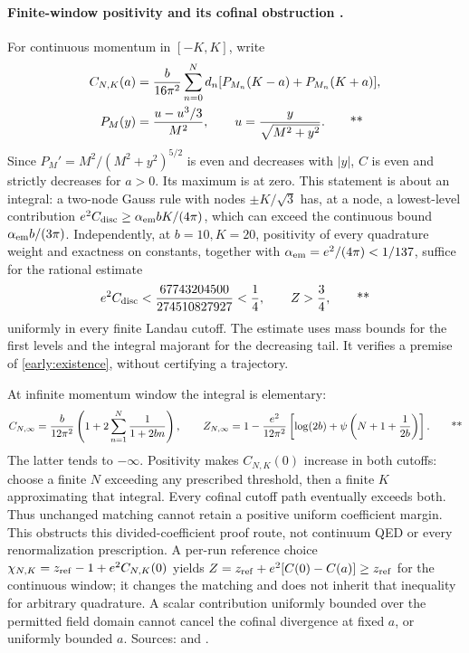 \paragraph{Finite-window positivity and its cofinal obstruction \workstar.}
For continuous momentum in \([-K,K]\), write
\begin{align}
 C_{N,K}(a)&=\frac{b}{16\pi^2}\sum_{n=0}^Nd_n
 [P_{M_n}(K-a)+P_{M_n}(K+a)],\notag\\
 P_M(y)&=\frac{u-u^3/3}{M^2},\qquad u=\frac{y}{\sqrt{M^2+y^2}}.
 \qquad\text{**}\label{early:window}
\end{align}
Since \(P_M'=M^2/(M^2+y^2)^{5/2}\) is even and decreases with \(|y|\),
\(C\) is even and strictly decreases for \(a>0\).  Its maximum is at zero.
This statement is about an integral: a two-node Gauss rule with nodes
\(\pm K/\sqrt3\) has, at a node, a lowest-level contribution
\(e^2C_{\rm disc}\ge\alpha_{\rm em}bK/(4\pi)\), which can exceed the
continuous bound \(\alpha_{\rm em}b/(3\pi)\).
Independently, at \(b=10,K=20\), positivity of every quadrature weight and
exactness on constants, together with
\(\alpha_{\rm em}=e^2/(4\pi)<1/137\), suffice for the rational estimate
\begin{equation}
 e^2C_{\rm disc}<\frac{67743204500}{274510827927}<\frac14,
 \qquad Z>\frac34,
 \qquad\text{**}\label{early:rationalz}
\end{equation}
uniformly in every finite Landau cutoff.  The estimate uses mass bounds for
the first levels and the integral majorant for the decreasing tail.
It verifies a premise of \eqref{early:existence}, without certifying a trajectory.

At infinite momentum window the integral is elementary:
\begin{equation}
 C_{N,\infty}=\frac{b}{12\pi^2}
 \left(1+2\sum_{n=1}^N\frac1{1+2bn}\right),\qquad
 Z_{N,\infty}=1-\frac{e^2}{12\pi^2}
 \left[\log(2b)+\psi\left(N+1+\frac1{2b}\right)\right].
 \qquad\text{**}\label{early:cofinal}
\end{equation}
The latter tends to \(-\infty\).  Positivity makes \(C_{N,K}(0)\) increase
in both cutoffs: choose a finite \(N\) exceeding any prescribed threshold,
then a finite \(K\) approximating that integral.  Every cofinal cutoff path
eventually exceeds both.  Thus unchanged matching cannot retain a positive
uniform coefficient margin.  This obstructs this divided-coefficient proof
route, not continuum QED or every renormalization prescription.  A per-run
reference choice \(\chi_{N,K}=z_{\rm ref}-1+e^2C_{N,K}(0)\) yields
\(Z=z_{\rm ref}+e^2[C(0)-C(a)]\ge z_{\rm ref}\) for the continuous window;
it changes the matching and does not inherit that inequality for arbitrary
quadrature.  A scalar contribution uniformly bounded over the permitted
field domain cannot cancel the cofinal divergence at fixed \(a\), or uniformly
bounded \(a\).  Sources:  and
.

